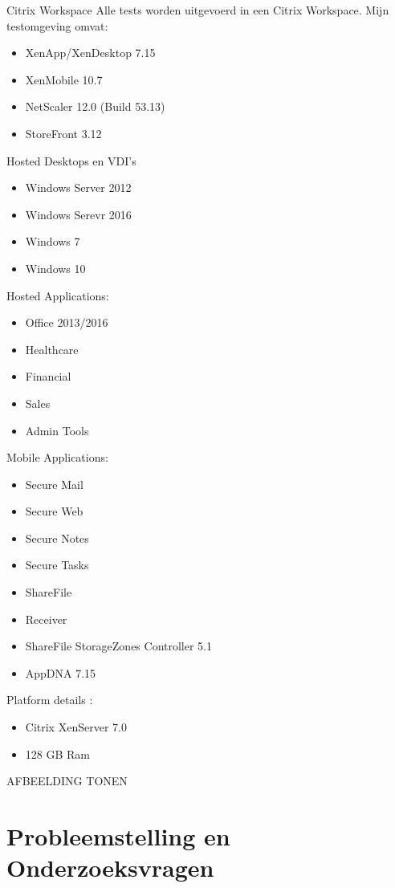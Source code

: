 Citrix Workspace
Alle tests worden uitgevoerd in een Citrix Workspace. Mijn testomgeving omvat:
\begin{itemize}
	\item XenApp/XenDesktop 7.15
	\item XenMobile 10.7
	\item NetScaler 12.0 (Build 53.13)
	\item StoreFront 3.12
\end{itemize}
Hosted Desktops en VDI's
\begin{itemize}
	\item Windows Server 2012
	\item Windows Serevr 2016
	\item Windows 7
	\item Windows 10
\end{itemize}
Hosted Applications:
\begin{itemize}	
	\item Office 2013/2016
	\item Healthcare
	\item Financial
	\item Sales
	\item Admin Tools
\end{itemize}
Mobile Applications:
\begin{itemize}
	\item Secure Mail
	\item Secure Web
	\item Secure Notes
	\item Secure Tasks
	\item ShareFile
	\item Receiver
	\item ShareFile StorageZones Controller 5.1
	\item AppDNA 7.15
\end{itemize}
Platform details :
\begin{itemize}
	\item Citrix XenServer 7.0
	\item 128 GB Ram
	
\end{itemize}

AFBEELDING TONEN



\section{Probleemstelling en Onderzoeksvragen}
\label{sec:onderzoeksvragen}

